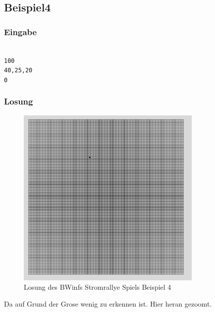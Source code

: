 \documentclass[a4paper,12pt,arial]{scrartcl}
\begin{document}
\subsection{Beispiel4}
\subsubsection{Eingabe}
\texttt{ \\
100 \\
40,25,20 \\
0 \\
}
\subsubsection{Losung}
\begin{figure}[h]
    \centering
    \includegraphics[width=0.8\textwidth]{solution4.png}
    \caption{Losung des BWinfs Stromrallye Spiels Beispiel 4}
    \label{fig:loesung4}
\end{figure}
Da auf Grund der Grose wenig zu erkennen ist.
Hier heran gezoomt.
\end{document}
